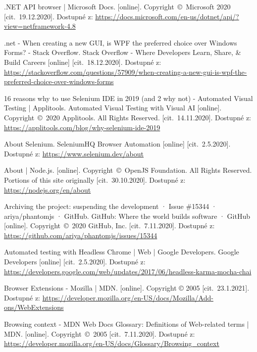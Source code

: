 \newpage
{}
\begin{thebibliography}{99}

 .NET API browser | Microsoft Docs. [online]. Copyright~©~Microsoft 2020 [cit.~19.12.2020]. Dostupné z: \url{https://docs.microsoft.com/en-us/dotnet/api/?view=netframework-4.8}

 .net - When creating a new GUI, is WPF the preferred choice over Windows Forms? - Stack Overflow. Stack Overflow - Where Developers Learn, Share, \& Build Careers [online] [cit.~18.12.2020]. Dostupné z: \url{https://stackoverflow.com/questions/57909/when-creating-a-new-gui-is-wpf-the-preferred-choice-over-windows-forms}

 16 reasons why to use Selenium IDE in 2019 (and 2 why not) - Automated Visual Testing | Applitools. Automated Visual Testing with Visual AI [online]. Copyright~©~2020 Applitools. All Rights Reserved. [cit.~14.11.2020]. Dostupné z: \url{https://applitools.com/blog/why-selenium-ide-2019}

 About Selenium. SeleniumHQ Browser Automation [online] [cit.~2.5.2020]. Dostupné z: \url{https://www.selenium.dev/about}

 About | Node.js. [online]. Copyright~©~OpenJS Foundation. All Rights Reserved. Portions of this site originally [cit.~30.10.2020]. Dostupné z: \url{https://nodejs.org/en/about}

 Archiving the project: suspending the development · Issue \#15344 · ariya/phantomjs · GitHub. GitHub: Where the world builds software · GitHub [online]. Copyright~©~2020 GitHub, Inc. [cit.~7.11.2020]. Dostupné z: \url{https://github.com/ariya/phantomjs/issues/15344}

 Automated testing with Headless Chrome  |  Web  |  Google Developers. Google Developers [online] [cit.~2.5.2020]. Dostupné z: \url{https://developers.google.com/web/updates/2017/06/headless-karma-mocha-chai}

Browser Extensions - Mozilla | MDN. [online]. Copyright © 2005 [cit.~23.1.2021]. Dostupné z: \url{https://developer.mozilla.org/en-US/docs/Mozilla/Add-ons/WebExtensions}

 Browsing context - MDN Web Docs Glossary: Definitions of Web-related terms | MDN. [online]. Copyright~©~2005 [cit.~7.11.2020]. Dostupné z: \url{https://developer.mozilla.org/en-US/docs/Glossary/Browsing_context}


\end{thebibliography}
